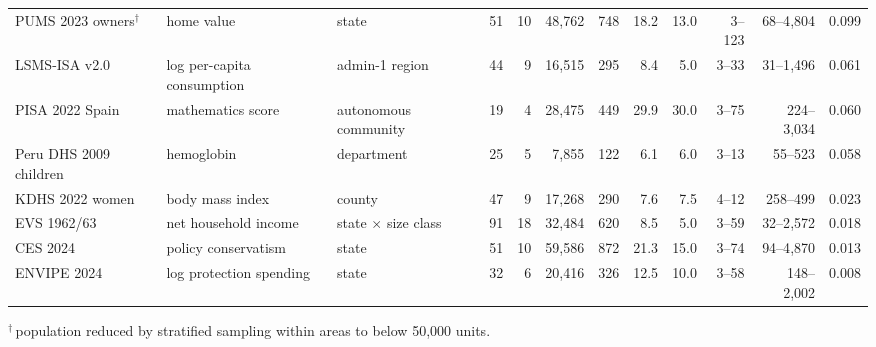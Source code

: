 \begin{table}[H]
\begin{tabular}{@{}lllrrrrrrrrr@{}}
PUMS 2023 owners$^{\dagger}$ \citep{census2024pums} & home value & state & 51 & 10 & 48{,}762 & 748 & 18.2 & 13.0 & 3--123 & 68--4{,}804 & 0.099 \\
LSMS-ISA v2.0 \citep{lsms2025isa} & log per-capita consumption & admin-1 region & 44 & 9 & 16{,}515 & 295 & 8.4 & 5.0 & 3--33 & 31--1{,}496 & 0.061 \\
PISA 2022 Spain \citep{oecd2023pisa} & mathematics score & autonomous community & 19 & 4 & 28{,}475 & 449 & 29.9 & 30.0 & 3--75 & 224--3{,}034 & 0.060 \\
Peru DHS 2009 children \citep{inei2010endes} & hemoglobin & department & 25 & 5 & 7{,}855 & 122 & 6.1 & 6.0 & 3--13 & 55--523 & 0.058 \\
KDHS 2022 women \citep{knbs2023kdhs} & body mass index & county & 47 & 9 & 17{,}268 & 290 & 7.6 & 7.5 & 4--12 & 258--499 & 0.023 \\
EVS 1962/63 \citep{fdz_evs1963} & net household income & state $\times$ size class & 91 & 18 & 32{,}484 & 620 & 8.5 & 5.0 & 3--59 & 32--2{,}572 & 0.018 \\
CES 2024 \citep{kuriwaki2025ces} & policy conservatism & state & 51 & 10 & 59{,}586 & 872 & 21.3 & 15.0 & 3--74 & 94--4{,}870 & 0.013 \\
ENVIPE 2024 \citep{inegi2024envipe} & log protection spending & state & 32 & 6 & 20{,}416 & 326 & 12.5 & 10.0 & 3--58 & 148--2{,}002 & 0.008 \\
\bottomrule
\end{tabular}
\par\smallskip
{\raggedright\scriptsize $^{\dagger}$\,population reduced by stratified
sampling within areas to below 50{,}000 units.\par}
\end{table}
